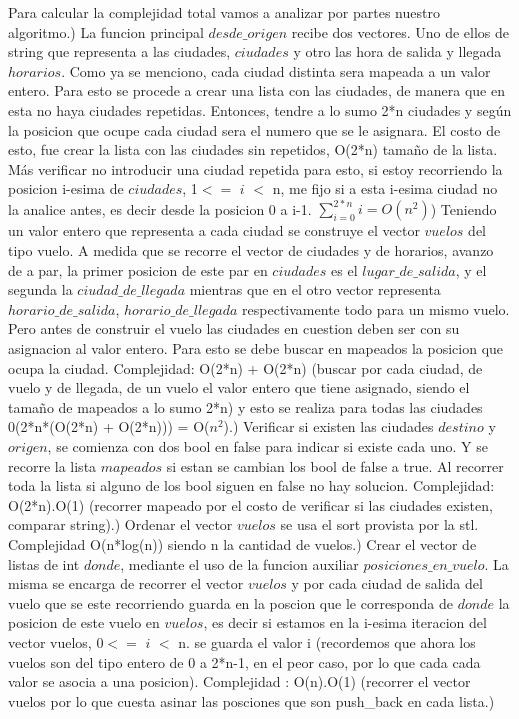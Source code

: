\documentclass[a4paper]{article}
\begin{document}
Para calcular la complejidad total vamos a analizar por partes nuestro algoritmo.) La funcion principal $desde\_origen$ recibe dos vectores. Uno de ellos de string que representa a las ciudades, $ciudades$ y otro las hora de salida y llegada $horarios$. Como ya se menciono, cada ciudad distinta sera mapeada a un valor entero. Para esto se procede a crear una lista con las ciudades, de manera que en esta no haya ciudades repetidas. Entonces, tendre a lo sumo 2*n ciudades y según la posicion que ocupe cada ciudad sera el numero que se le asignara. El costo de esto, fue crear la lista con las ciudades sin repetidos,  O(2*n) tamaño de la lista. Más verificar no introducir una ciudad repetida para esto, si estoy recorriendo la posicion i-esima de $ciudades$, 1$<=$ $i$ $<$ n,  me fijo si a esta i-esima ciudad no la analice antes, es decir desde la posicion 0 a i-1. \newline
$\sum_{i=0}^{2*n}{i}= O(n^{2})$) Teniendo un valor entero que representa a cada ciudad se construye el vector $vuelos$ del tipo  vuelo. A medida que se recorre el vector de ciudades y de horarios, avanzo de a par, la primer posicion de este par en $ciudades$ es el $lugar\_de\_salida$, y el segunda la $ciudad\_de\_llegada$ mientras que en el otro vector representa $horario\_de\_salida$, $horario\_de\_llegada$ respectivamente todo para un mismo vuelo. Pero antes de construir el vuelo las ciudades en cuestion  deben ser con su asignacion al valor entero. Para esto se debe buscar en mapeados la posicion que ocupa la ciudad. Complejidad:
O(2*n) + O(2*n) (buscar por cada ciudad, de vuelo y de llegada, de un vuelo el valor entero que tiene asignado, siendo el tamaño de mapeados a lo sumo 2*n) y esto se realiza para todas las ciudades 0(2*n*(O(2*n) + O(2*n))) = O($n^{2}$).) Verificar si existen las ciudades $destino$ y $origen$, se comienza con dos bool en false para indicar si existe cada uno.  Y se recorre la lista $mapeados$ si estan se cambian los bool  de false a true.  Al recorrer toda la lista si alguno de los bool siguen en false no hay solucion. Complejidad: O(2*n).O(1) (recorrer mapeado por el costo de verificar si las ciudades existen, comparar string).)    Ordenar el vector $vuelos$ se usa el   sort provista por la stl. Complejidad O(n*log(n)) siendo n la cantidad de vuelos.) Crear el vector de listas de int $donde$, mediante el uso de la funcion auxiliar $posiciones\_en\_vuelo$. La misma se encarga de recorrer el vector $vuelos$ y por cada ciudad de salida del vuelo que se este recorriendo guarda en la poscion que le corresponda de $donde$ la posicion de este vuelo en $vuelos$, es decir si estamos en la i-esima iteracion del vector vuelos, 0$<=$ $i$ $<$ n. se guarda el valor i (recordemos que ahora los vuelos son del tipo entero de 0 a 2*n-1, en el peor caso, por lo que cada cada valor se asocia a una posicion). Complejidad : O(n).O(1) (recorrer el vector vuelos por lo que cuesta asinar las posciones que son push\_back en cada lista.)\newline
\end{document}

